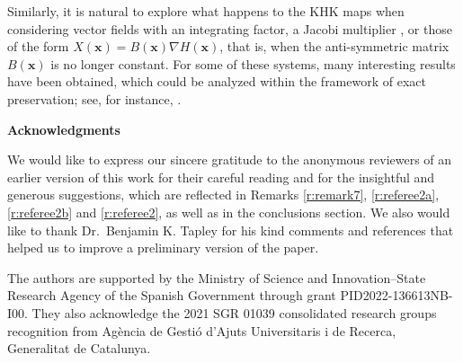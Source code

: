 \documentclass[11pt]{article}
\begin{document}
Similarly, it is natural to explore what happens to the KHK maps when considering vector fields with an integrating factor, a Jacobi multiplier \cite{BeGia}, or those of the form $X(\mathbf{x}) = B(\mathbf{x})\nabla H(\mathbf{x}) $, that is, when the anti-symmetric matrix $ B(\mathbf{x}) $ is no longer constant. For some of these systems, many interesting results have been obtained, which could be analyzed within the framework of exact preservation; see, for instance, \cite{Cel17,GJ20,Kam19,PZ17}.  




\bigskip

 \centerline{\textbf{Acknowledgments}}

\medskip

We would like to express our sincere gratitude to the anonymous reviewers of an earlier version of this work for their careful reading and for the insightful and generous suggestions, which are reflected in Remarks \ref{r:remark7}, \ref{r:referee2a}, \ref{r:referee2b} and \ref{r:referee2}, as well as in the conclusions section. We also would like to thank Dr.~Benjamin K. Tapley for his kind comments and references that helped us to improve a preliminary version of the paper.
\medskip

The authors are supported by the Ministry of Science and Innovation--State Research Agency of the
Spanish Government through grant PID2022-136613NB-I00.
 They also acknowledge the 2021 SGR 01039 consolidated research groups recognition from Ag\`{e}ncia de Gesti\'{o} d'Ajuts Universitaris i de Recerca, Generalitat de Catalunya.
\end{document}
